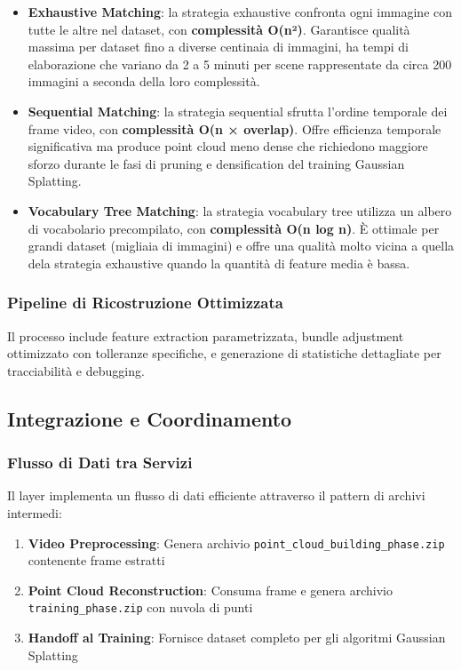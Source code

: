 \begin{itemize}
\item \textbf{Exhaustive Matching}: la strategia exhaustive confronta ogni immagine con tutte le altre nel dataset, con \textbf{complessità O(n²)}. Garantisce qualità massima per dataset fino a diverse centinaia di immagini, ha tempi di elaborazione che variano da 2 a 5 minuti per scene rappresentate da circa 200 immagini a seconda della loro complessità.

\item \textbf{Sequential Matching}:
la strategia sequential sfrutta l'ordine temporale dei frame video, con \textbf{complessità O(n × overlap)}. Offre efficienza temporale significativa ma produce point cloud meno dense che richiedono maggiore sforzo durante le fasi di pruning e densification del training Gaussian Splatting.

\item \textbf{Vocabulary Tree Matching}:
la strategia vocabulary tree utilizza un albero di vocabolario precompilato, con \textbf{complessità O(n log n)}. È ottimale per grandi dataset (migliaia di immagini) e offre una qualità molto vicina a quella dela strategia exhaustive quando la quantità di feature media è bassa.
\end{itemize}	
\subsubsection{Pipeline di Ricostruzione Ottimizzata}

Il processo include feature extraction parametrizzata, bundle adjustment ottimizzato con tolleranze specifiche, e generazione di statistiche dettagliate per tracciabilità e debugging.

\subsection{Integrazione e Coordinamento}

\subsubsection{Flusso di Dati tra Servizi}

Il layer implementa un flusso di dati efficiente attraverso il pattern di archivi intermedi:

\begin{enumerate}
	\item \textbf{Video Preprocessing}: Genera archivio \texttt{point\_cloud\_building\_phase.zip} contenente frame estratti
	\item \textbf{Point Cloud Reconstruction}: Consuma frame e genera archivio \texttt{training\_phase.zip} con nuvola di punti
	\item \textbf{Handoff al Training}: Fornisce dataset completo per gli algoritmi Gaussian Splatting
\end{enumerate}

